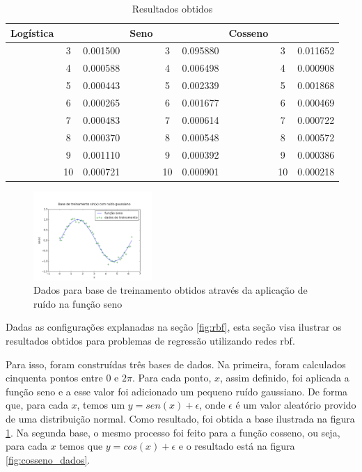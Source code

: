 \documentclass[conference]{IEEEtran}
\begin{document}
\begin{table}[t]
	\centering
	\caption{Resultados obtidos}
	\label{corrmatrix}
	\begin{tabular}{l c c l c c l c c}
		\toprule
		Logística & & & Seno & & & Cosseno & & \\
		\midrule
		{} & 3 & 0.001500 & {} & 3 & 0.095880 & {} & 3 & 0.011652 \\
		{} & 4 & 0.000588 & {} & 4 & 0.006498 & {} & 4 & 0.000908 \\
		{} & 5 & 0.000443 & {} & 5 & 0.002339 & {} & 5 & 0.001868 \\
		{} & 6 & 0.000265 & {} & 6 & 0.001677 & {} & 6 & 0.000469 \\
		{} & 7 & 0.000483 & {} & 7 & 0.000614 & {} & 7 & 0.000722 \\
		{} & 8 & 0.000370 & {} & 8 & 0.000548 & {} & 8 & 0.000572 \\
		{} & 9 & 0.001110 & {} & 9 & 0.000392 & {} & 9 & 0.000386 \\
		{} & 10 & 0.000721 & {} & 10 & 0.000901 & {} & 10 & 0.000218 \\
		\bottomrule
	\end{tabular}
\end{table}


\begin{figure}[b]
	\caption{Dados para base de treinamento obtidos através da aplicação de 
		ruído na função seno}
	\label{fig:seno_dados}
	\centering
	\includegraphics[width=0.40\textwidth]{sin_5v1_train_data_paper}
\end{figure}

Dadas as configurações explanadas na seção \ref{fig:rbf}, esta seção visa 
ilustrar os resultados obtidos para problemas de regressão utilizando redes 
\ac*{rbf}.

Para isso, foram construídas três bases de dados. Na primeira, foram 
calculados cinquenta pontos entre $0$ e $2\pi$. Para cada ponto, $x$, assim 
definido, foi aplicada a função seno e a esse valor foi adicionado um pequeno 
ruído gaussiano. De forma que, para cada $x$, temos um $y = sen(x) + 
\epsilon$, onde $\epsilon$ é um valor aleatório provido de uma distribuição 
normal. Como resultado, foi obtida a base ilustrada na figura 
\ref{fig:seno_dados}. Na segunda base, o mesmo processo foi feito para a função 
cosseno, ou seja, para cada $x$ temos que $y = cos(x) + \epsilon$ e o 
resultado está na figura \ref{fig:cosseno_dados}.
\end{document}
